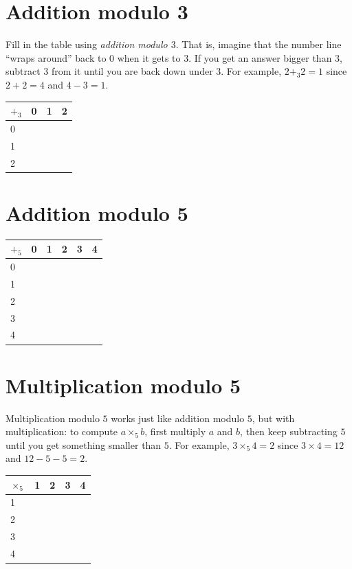 \documentclass{article}
\begin{document}
\section*{Addition modulo 3}

Fill in the table using \emph{addition modulo $3$}.  That is, imagine
that the number line ``wraps around'' back to $0$ when it gets to
$3$.  If you get an answer bigger than $3$, subtract $3$ from it until
you are back down under $3$.  For example, $2 +_3 2 = 1$ since $2 + 2
= 4$ and $4 - 3 = 1$.

\begin{center}
\begin{tabular}{l|lll}
$+_3$ & 0 & 1 & 2 \\ \hline
0        &   &   &   \\
1        &   &   &   \\
2        &   &   &
\end{tabular}
\end{center}

\section*{Addition modulo 5}

\begin{center}
\begin{tabular}{l|lllll}
$+_5$ & 0 & 1 & 2 & 3 & 4 \\ \hline
0        &   &   &   &   &   \\
1        &   &   &   &   &   \\
2        &   &   &   &   &   \\
3        &   &   &   &   &   \\
4        &   &   &   &   &  
\end{tabular}
\end{center}

\section*{Multiplication modulo 5}

Multiplication modulo $5$ works just like addition modulo $5$, but
with multiplication: to compute $a \times_5 b$, first multiply $a$ and
$b$, then keep subtracting $5$ until you get something smaller than
$5$.  For example, $3 \times_5 4 = 2$ since $3 \times 4 = 12$ and $12
- 5 - 5 = 2$.

\begin{center}
\begin{tabular}{l|llll}
$\times_5$ & 1 & 2 & 3 & 4 \\ \hline
1          &   &   &   &   \\
2          &   &   &   &   \\
3          &   &   &   &   \\
4          &   &   &   &
\end{tabular}
\end{center}
\end{document}
